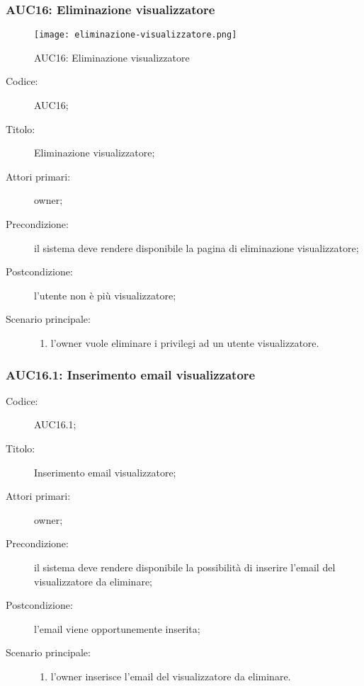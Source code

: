 \documentclass[../../../analisi-dei-requisiti.tex]{subfiles}
\begin{document}
\subsubsection{AUC16: Eliminazione visualizzatore}%
\label{subs:AUC16}

\begin{figure}[H]
  \centering
  \texttt{[image: eliminazione-visualizzatore.png]}
  \caption{AUC16: Eliminazione visualizzatore}%
  \label{fig:AUC16}
\end{figure}

\begin{description}
  \item[Codice:] AUC16;
  \item[Titolo:] Eliminazione visualizzatore;
  \item[Attori primari:] owner;
  \item[Precondizione:] il sistema deve rendere disponibile la pagina di eliminazione visualizzatore;
  \item[Postcondizione:] l'utente non è più visualizzatore;
  \item[Scenario principale:]
        \begin{enumerate}
          \item l'owner vuole eliminare i privilegi ad un utente visualizzatore.
        \end{enumerate}
\end{description}

\subsubsection{AUC16.1: Inserimento email visualizzatore}%
\label{subs:AUC16.1}
\begin{description}
  \item[Codice:] AUC16.1;
  \item[Titolo:] Inserimento email visualizzatore;
  \item[Attori primari:] owner;
  \item[Precondizione:] il sistema deve rendere disponibile la possibilità di inserire l'email del visualizzatore da eliminare;
  \item[Postcondizione:] l'email viene opportunemente inserita;
  \item[Scenario principale:]
        \begin{enumerate}
          \item l'owner inserisce l'email del visualizzatore da eliminare.
        \end{enumerate}
\end{description}
\end{document}
